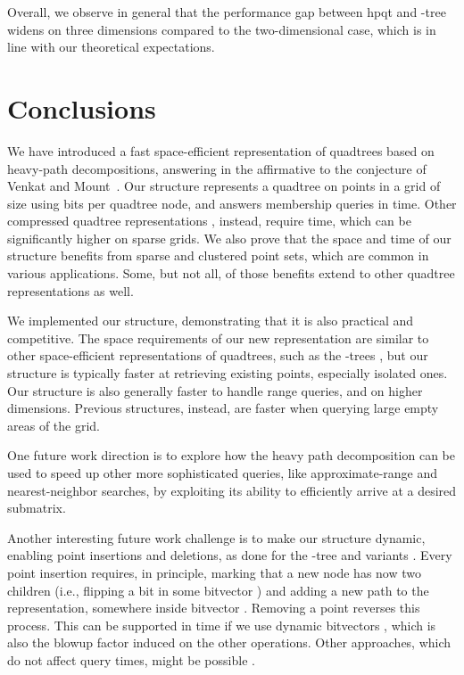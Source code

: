 \documentclass{elsarticle}
\newcommand{\kt}{-tree\xspace}
\newcommand{\hpqt}{\textsf{hpqt}\xspace}
\begin{document}
Overall, we observe in general that the performance gap between \hpqt and \kt widens on three dimensions compared to the two-dimensional case, which is in line with our theoretical expectations.

\section{Conclusions}
\label{sec:conclusions}

We have introduced a fast space-efficient representation of quadtrees based on heavy-path decompositions, answering in the affirmative to the conjecture of Venkat and Mount~\cite{VM14}. Our structure represents a quadtree on  points in a grid of size  using  bits per quadtree node, and answers membership queries in  time. Other compressed quadtree representations \cite{BLN14,VM14}, instead, require  time, which can be significantly higher on sparse grids. We also prove that the space and time of our structure benefits from sparse and clustered point sets, which are common in various applications. Some, but not all, of those benefits extend to other quadtree representations as well.

We implemented our structure, demonstrating that it is also practical and competitive. The space requirements of our new representation are similar to other space-efficient representations of quadtrees, such as the -trees \cite{BLN14}, but our structure is typically faster at retrieving existing points, especially isolated ones. Our structure is also generally faster to handle range queries, and on higher dimensions. Previous structures, instead, are faster when querying large empty areas of the grid.

One future work direction is to explore how the heavy path decomposition can be used to speed up other more sophisticated queries, like approximate-range and nearest-neighbor searches, by exploiting its ability to efficiently arrive at a desired submatrix.

Another interesting future work challenge is to make our structure dynamic, enabling point insertions and deletions, as done for the \kt and variants \cite{VM14,BCPdBN17,AdBGN19}. Every point insertion requires, in principle, marking that a new node has now two children (i.e., flipping a bit in some bitvector ) and adding a new path to the representation, somewhere inside bitvector . Removing a point reverses this process. This can be supported in time  if we use dynamic bitvectors \cite{NS12}, which is also the blowup factor induced on the other operations. Other approaches, which do not affect query times, might be possible \cite{CFRdBLN20}.
\end{document}
